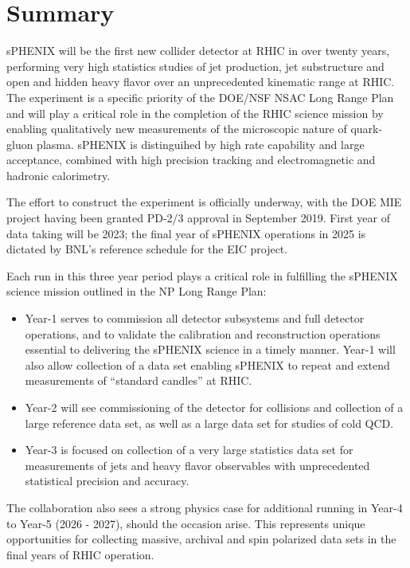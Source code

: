 \chapter{Summary}
\label{chap:summary}

sPHENIX will be the first new collider detector at RHIC in over twenty
years,  performing very high statistics studies of jet
production, jet substructure and open and hidden heavy flavor over an
unprecedented kinematic range at RHIC.  The experiment
is a specific priority of the DOE/NSF NSAC Long Range Plan and 
will play a critical role in the completion of the RHIC science mission by enabling qualitatively
new measurements of the microscopic nature of quark-gluon plasma.
sPHENIX is distinguihed by high rate capability and large acceptance, 
combined with high precision tracking and electromagnetic and hadronic calorimetry.

The effort to construct the experiment is officially underway, with
the DOE MIE project having been granted PD-2/3 approval in September
2019. First year of data taking will be 2023; the final year of sPHENIX operations in
2025 is dictated by BNL's reference schedule for the EIC project.

Each run in this three year period plays a critical role in fulfilling the 
sPHENIX science mission outlined in the NP Long Range Plan:
\begin{itemize}
\item Year-1 serves to commission all detector subsystems and full
  detector operations, and to validate the calibration and
  reconstruction operations essential to delivering the sPHENIX
  science in a timely manner.  Year-1 will
  also allow collection of a \auau data set enabling sPHENIX to repeat
  and extend measurements of ``standard candles'' at RHIC.
\item Year-2 will see commissioning of the detector for \pp collisions
 and collection of a large \pp reference data set, as well as a large \pAu data set
  for studies of cold QCD.
\item Year-3 is focused on collection of a very large statistics \auau
 data set for measurements of jets and heavy flavor observables with
  unprecedented statistical precision and accuracy.
\end{itemize}

The collaboration also sees a strong physics case for additional running in Year-4 to Year-5 (2026 - 2027), should the occasion
arise. This represents unique opportunities for collecting massive,
archival \apa and spin polarized \pp data sets in the final years of
RHIC operation. 
